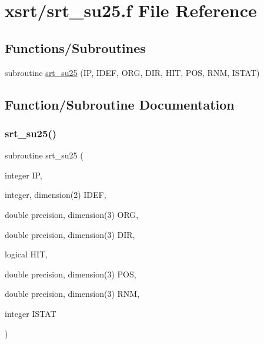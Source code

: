 \hypertarget{srt__su25_8f}{}\section{xsrt/srt\+\_\+su25.f File Reference}
\label{srt__su25_8f}
\subsection*{Functions/\+Subroutines}
\begin{DoxyCompactItemize}
\item 
subroutine \hyperlink{srt__su25_8f_ac01a4fb0c209f87938a196d6798e4fa5}{srt\+\_\+su25} (IP, I\+D\+EF, O\+RG, D\+IR, H\+IT, P\+OS, R\+NM, I\+S\+T\+AT)
\end{DoxyCompactItemize}


\subsection{Function/\+Subroutine Documentation}
\mbox{\label{srt__su25_8f_ac01a4fb0c209f87938a196d6798e4fa5}} 
\subsubsection{\texorpdfstring{srt\+\_\+su25()}{srt\_su25()}}
{\footnotesize\ttfamily subroutine srt\+\_\+su25 (\begin{DoxyParamCaption}\item[{integer}]{IP,  }\item[{integer, dimension(2)}]{I\+D\+EF,  }\item[{double precision, dimension(3)}]{O\+RG,  }\item[{double precision, dimension(3)}]{D\+IR,  }\item[{logical}]{H\+IT,  }\item[{double precision, dimension(3)}]{P\+OS,  }\item[{double precision, dimension(3)}]{R\+NM,  }\item[{integer}]{I\+S\+T\+AT }\end{DoxyParamCaption})}

